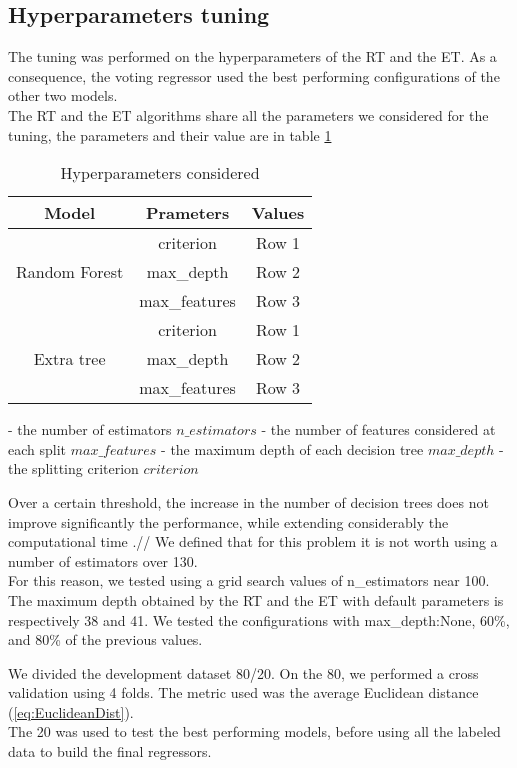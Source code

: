 \documentclass[conference]{IEEEtran}
\begin{document}
\subsection{Hyperparameters tuning}
The tuning was performed on the hyperparameters of the RT and the ET. As a consequence, the voting regressor used the best performing configurations of the other two models. \\
The RT and the ET algorithms share all the parameters we considered for the tuning, the parameters and their value are in table \ref{tab:tabHP}
\begin{table}
    \centering
    \caption{Hyperparameters considered}
    \label{tab:tabHP}
    \begin{tabular}{|c|c|c|}
        \hline
        \textbf{Model} & \textbf{Prameters} & \textbf{Values} \\
        \hline
        &criterion&Row 1\\
        Random Forest&max\_depth&Row 2\\
        &max\_features&Row 3\\
        \hline
        &criterion&Row 1\\
        Extra tree&max\_depth&Row 2\\
        &max\_features&Row 3\\
        \hline
    \end{tabular}
\end{table}
- the number of estimators $n\_estimators$
- the number of features considered at each split $max\_features$
- the maximum depth of each decision tree $max\_depth$
- the splitting criterion $criterion$

Over a certain threshold, the increase in the number of decision trees does not improve significantly the performance, while extending considerably the computational time \cite{paper:howManyTree}.// 
We defined that for this problem it is not worth using a number of estimators over 130.\\  
For this reason, we tested using a grid search values of n_estimators near 100.\\

The maximum depth obtained by the RT and the ET with default parameters is respectively 38 and 41. We tested the configurations with max\_depth:None, 60\%, and 80\% of the previous values. 

We divided the development dataset 80/20. On the 80, we performed a cross validation using 4 folds. The metric used was the average Euclidean distance (\ref{eq:EuclideanDist}).\\
The 20 was used to test the best performing models, before using all the labeled data to build the final regressors.
\end{document}
